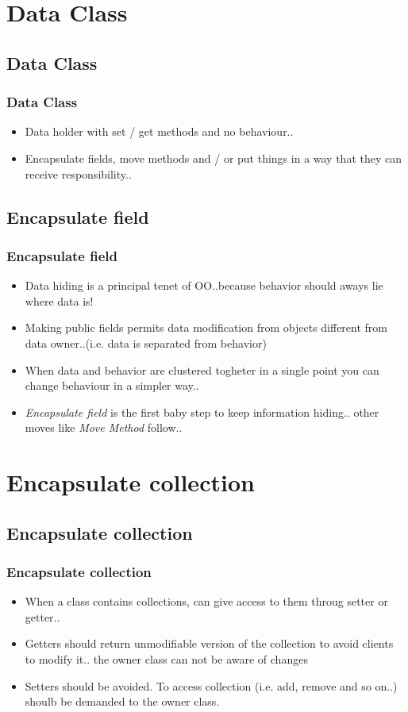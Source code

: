 \documentclass{beamer}
\begin{document}
\section{Data Class}
\subsection{Data Class}
\begin{frame}
  \frametitle{Data Class}
  \begin{itemize}
	\item<+-> Data holder with set / get methods and no behaviour..
	\item<+-> Encapsulate fields, move methods and / or put things in a way that they can receive responsibility..
   \end{itemize}
\end{frame}

\subsection{Encapsulate field}
\begin{frame}
  \frametitle{Encapsulate field}
  \begin{itemize}
	\item<+-> Data hiding is a principal tenet of OO..because behavior should aways lie where data is!
	\item<+-> Making public fields permits data modification from objects different from data owner..(i.e. data is separated from behavior)
	\item<+-> When data and behavior are clustered togheter in a single point you can change behaviour in a simpler way.. 
	\item<+-> \textit{Encapsulate field} is the first baby step to keep information hiding.. other moves like \textit{Move Method} follow..
   \end{itemize}
\end{frame}

\section{Encapsulate collection}
\subsection{Encapsulate collection}
\begin{frame}
  \frametitle{Encapsulate collection}
  \begin{itemize}
	\item<+-> When a class contains collections, can give access to them throug setter or getter..
	\item<+-> Getters should return unmodifiable version of the collection to avoid clients to modify it.. the owner class can not be aware of changes
	\item<+-> Setters should be avoided. To access collection (i.e. add, remove and so on..) shoulb be demanded to the owner class.
   \end{itemize}
\end{frame}
\end{document}
